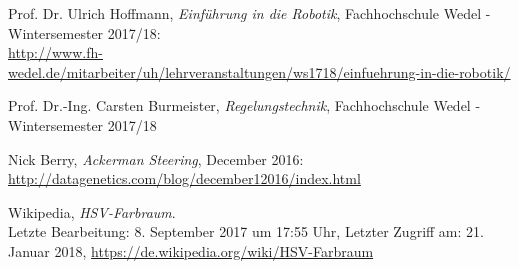 \documentclass[a4paper,12pt]{report}
\begin{document}
\begin{thebibliography}{9}

	Prof. Dr. Ulrich Hoffmann,
	\textit{Einführung in die Robotik},
	Fachhochschule Wedel - Wintersemester 2017/18:\\
	\url{http://www.fh-wedel.de/mitarbeiter/uh/lehrveranstaltungen/ws1718/einfuehrung-in-die-robotik/}

	Prof. Dr.-Ing. Carsten Burmeister,
	\textit{Regelungstechnik},
	Fachhochschule Wedel - Wintersemester 2017/18

	Nick Berry,
	\textit{Ackerman Steering},
	December 2016:\\
	\url{http://datagenetics.com/blog/december12016/index.html}

	Wikipedia,
	\textit{HSV-Farbraum}.\\
	Letzte Bearbeitung: 8. September 2017 um 17:55 Uhr,
	Letzter Zugriff am: 21. Januar 2018,
	\url{https://de.wikipedia.org/wiki/HSV-Farbraum}

\end{thebibliography}
\end{document}
